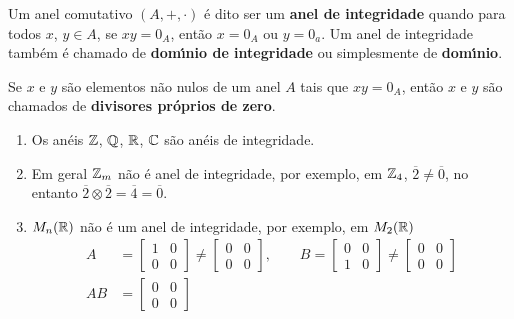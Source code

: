 \begin{definicao}
	Um anel comutativo $(A, + , \cdot)$ {\'e} dito ser um \textbf{anel de integridade} quando para todos 
	$x$, $y \in A$, se $xy = 0_A$, ent{\~a}o $x = 0_A$ ou $y = 0_a$. Um anel de integridade tamb{\'e}m {\'e} chamado de \textbf{dom{\'\i}nio de integridade} ou simplesmente de \textbf{dom{\'\i}nio}.
\end{definicao}

\begin{observacao}
	Se $x$ e $y$ s{\~a}o elementos n{\~a}o nulos de um anel $A$ tais que $xy = 0_A$, ent{\~a}o $x$ e $y$ s{\~a}o chamados de \textbf{divisores pr{\'o}prios de zero}.
\end{observacao}


\begin{exemplos}
	\begin{enumerate}[label={\arabic*})]
		\item Os an{\'e}is $\mathbb{Z}$, $\mathbb{Q}$, $\mathbb{R}$, $\mathbb{C}$ s{\~a}o an{\'e}is de integridade.
		
		\item Em geral $\mathbb{Z}_m$ n{\~a}o {\'e} anel de integridade, por exemplo, em $\mathbb{Z}_4$, $\overline{2} \neq \overline{0}$, no entanto $\overline{2}\otimes \overline{2} = \overline{4} = \overline{0}$.
		
		\item $M_{n}(\mathbb{R})$ n{\~a}o {\'e} um anel de integridade, por exemplo, em $M_{2}(\mathbb{R})$
		\begin{align*}
			A &= \begin{bmatrix}
				1 & 0\\
				0 & 0
			\end{bmatrix} \neq \begin{bmatrix}
				0 & 0\\
				0 & 0		
			\end{bmatrix},\qquad 
			B = \begin{bmatrix}
				0 & 0\\
				1 & 0
			\end{bmatrix} \neq \begin{bmatrix}
				0 & 0\\
				0 & 0
			\end{bmatrix}\\
			AB & =\begin{bmatrix}
				0 & 0\\
				0 & 0
			\end{bmatrix}
		\end{align*}


\end{enumerate}
\end{exemplos}
